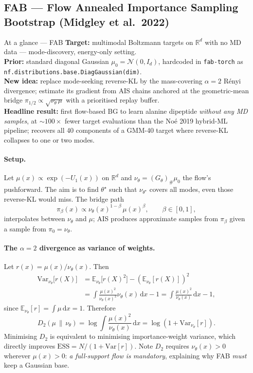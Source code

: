 \documentclass[11pt,letterpaper]{article}
\newcommand{\E}{\mathbb{E}}
\newcommand{\Real}{\mathbb{R}}
\newcommand{\ESS}{\mathrm{ESS}}
\newcommand{\dd}{\mathrm{d}}
\theoremstyle{plain}
\begin{document}
\subsection{FAB --- Flow Annealed Importance Sampling Bootstrap (Midgley et al.\ 2022)}\label{sec:FAB}

\begin{methodbox}{At a glance --- FAB}
\textbf{Target:} multimodal Boltzmann targets on $\Real^d$ with no MD data --- mode-discovery, energy-only setting.\\
\textbf{Prior:} standard diagonal Gaussian $\mu_0=\mathcal N(0,I_d)$, hardcoded in \texttt{fab-torch} as \verb|nf.distributions.base.DiagGaussian(dim)|.\\
\textbf{New idea:} replace mode-seeking reverse-KL by the mass-covering $\alpha=2$ R\'enyi divergence; estimate its gradient from AIS chains anchored at the geometric-mean bridge $\pi_{1/2}\propto\sqrt{\nu_\theta\,\mu}$ with a prioritised replay buffer.\\
\textbf{Headline result:} first flow-based BG to learn alanine dipeptide \emph{without any MD samples}, at $\sim 100\times$ fewer target evaluations than the Noé 2019 hybrid-ML pipeline; recovers all 40 components of a GMM-40 target where reverse-KL collapses to one or two modes.
\end{methodbox}

\paragraph{Setup.} Let $\mu(x)\propto\exp(-U_1(x))$ on $\Real^d$ and $\nu_\theta=(G_\theta)_\#\mu_0$ the flow's pushforward. The aim is to find $\theta^\star$ such that $\nu_{\theta^\star}$ covers all modes, even those reverse-KL would miss. The bridge path
\[
  \pi_\beta(x)\propto \nu_\theta(x)^{1-\beta}\,\mu(x)^\beta,\qquad \beta\in[0,1],
\]
interpolates between $\nu_\theta$ and $\mu$; AIS produces approximate samples from $\pi_\beta$ given a sample from $\pi_0=\nu_\theta$.

\paragraph{The $\alpha=2$ divergence as variance of weights.} Let $r(x)=\mu(x)/\nu_\theta(x)$. Then
\begin{align*}
  \mathrm{Var}_{\nu_\theta}\!\big[r(X)\big]
  &= \E_{\nu_\theta}\!\big[r(X)^2\big] - (\E_{\nu_\theta}[r(X)])^2 \\
  &= \int \frac{\mu(x)^2}{\nu_\theta(x)^2}\nu_\theta(x)\,\dd x - 1
   = \int \frac{\mu(x)^2}{\nu_\theta(x)}\,\dd x - 1,
\end{align*}
since $\E_{\nu_\theta}[r]=\int\mu\,\dd x=1$. Therefore
\[
  D_2(\mu\,\|\,\nu_\theta) = \log\!\int\frac{\mu(x)^2}{\nu_\theta(x)}\,\dd x = \log(1+\mathrm{Var}_{\nu_\theta}[r]).
\]
Minimising $D_2$ is equivalent to minimising importance-weight variance, which directly improves $\ESS=N/(1+\mathrm{Var}[r])$. Note $D_2$ requires $\nu_\theta(x)>0$ wherever $\mu(x)>0$: \emph{a full-support flow is mandatory}, explaining why FAB \emph{must} keep a Gaussian base.
\end{document}
